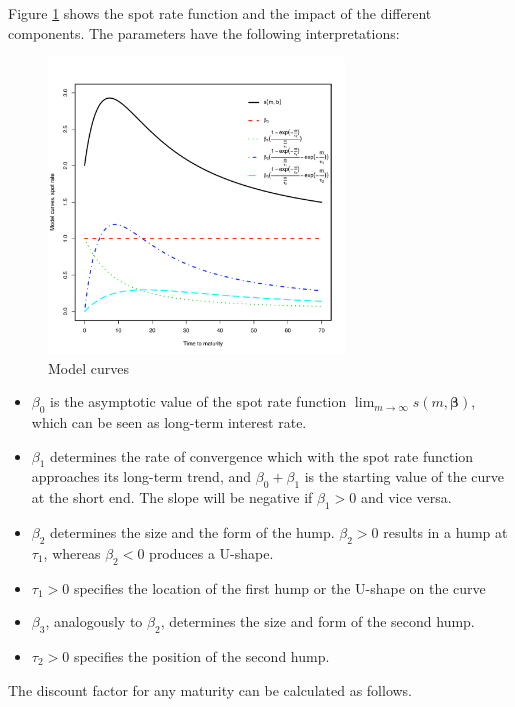 Figure \ref{fig:modelcurves} shows the \cite{Svensson1994} spot rate function and the impact of the different components. The parameters have the following interpretations:

%

\begin{figure}[htb]
\centering
  \caption{Model curves}
 \label{fig:modelcurves}
\includegraphics[width=0.7\textwidth]{curveshape}
\end{figure}

\begin{itemize}
\item $\beta_0$ is the asymptotic value of the spot rate function $\lim_{m\to\infty}s(m,\bm{\beta})$, which can be seen as long-term interest rate.
\item $\beta_1$ determines the rate of convergence which with the spot rate function approaches its long-term trend, and $\beta_0+\beta_1$ is the starting value of the curve at the short end. The slope will be negative if $\beta_1>0$ and vice versa.
\item $\beta_2$ determines the size and the form of the hump. $\beta_2 >0$  results in a hump at  $\tau_1$, whereas $\beta_2<0$ produces a U-shape.
\item $\tau_1>0$ specifies the location of the first hump or the U-shape on the curve
\item $\beta_3$, analogously to $\beta_2$, determines the size and form of the second hump.
\item $\tau_2>0$ specifies the position of the second hump.
\end{itemize}

The discount factor for any maturity can be calculated as follows. 

